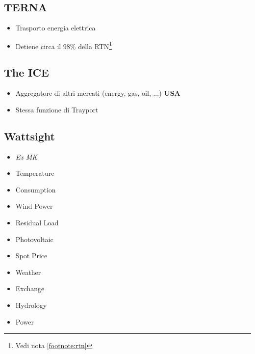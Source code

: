 \subsection{TERNA}
    \begin{itemize}
        \item Trasporto energia elettrica
        \item Detiene circa il 98\% della RTN\footnote{Vedi nota \ref{footnote:rtn}}
    \end{itemize}
\subsection{The ICE}
    \begin{itemize}
        \item Aggregatore di altri mercati (energy, gas, oil, ...) \textbf{USA}
        \item Stessa funzione di Trayport
    \end{itemize}
\subsection{Wattsight}
    \begin{itemize}
        \item \textit{Ex MK}
        \item Temperature
        \item Consumption
        \item Wind Power
        \item Residual Load
        \item Photovoltaic
        \item Spot Price
        \item Weather
        \item Exchange
        \item Hydrology
        \item Power
    \end{itemize}